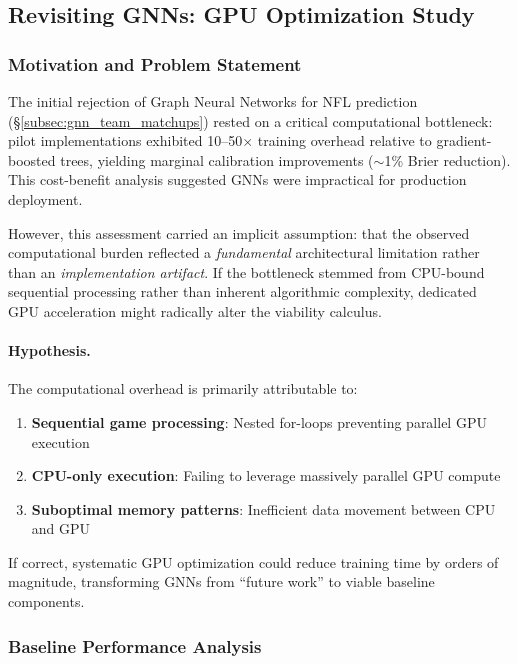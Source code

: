 \subsection{Revisiting GNNs: GPU Optimization Study}
\label{subsec:gnn_gpu_optimization}

\subsubsection{Motivation and Problem Statement}

The initial rejection of Graph Neural Networks for NFL prediction (\S\ref{subsec:gnn_team_matchups}) rested on a critical computational bottleneck: pilot implementations exhibited 10--50$\times$ training overhead relative to gradient-boosted trees, yielding marginal calibration improvements ($\sim$1\% Brier reduction).
This cost-benefit analysis suggested GNNs were impractical for production deployment.

However, this assessment carried an implicit assumption: that the observed computational burden reflected a \textit{fundamental} architectural limitation rather than an \textit{implementation artifact}.
If the bottleneck stemmed from CPU-bound sequential processing rather than inherent algorithmic complexity, dedicated GPU acceleration might radically alter the viability calculus.

\paragraph{Hypothesis.} The computational overhead is primarily attributable to:
\begin{enumerate}
    \item \textbf{Sequential game processing}: Nested for-loops preventing parallel GPU execution
    \item \textbf{CPU-only execution}: Failing to leverage massively parallel GPU compute
    \item \textbf{Suboptimal memory patterns}: Inefficient data movement between CPU and GPU
\end{enumerate}

If correct, systematic GPU optimization could reduce training time by orders of magnitude, transforming GNNs from ``future work'' to viable baseline components.

\subsubsection{Baseline Performance Analysis}

